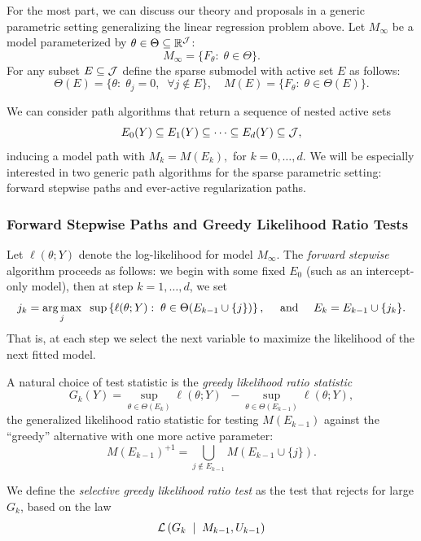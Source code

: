 \documentclass{article}
\begin{document}
For the most part, we can discuss our theory and proposals in a generic parametric setting generalizing the linear regression problem above. Let $M_\infty$ be a model parameterized by $\theta\in \Theta \subseteq \mathbb{R}^{\mathcal{J}}$:
\[
M_\infty = \{F_\theta:\; \theta \in \Theta\}.
\]
For any subset $E\subseteq \mathcal{J}$ define the sparse submodel with active set $E$ as follows:
\[
\Theta(E) = \{\theta:\; \theta_j = 0, \;\;\forall j \notin E\}, 
\quad M(E) = \{F_\theta:\; \theta\in \Theta(E)\}.
\]

We can consider path algorithms that return a sequence of nested active sets
\[
E_0(Y) \subseteq E_1(Y) \subseteq \cdots \subseteq E_d(Y) \subseteq \mathcal{J},
\]
inducing a model path with $M_k = M(E_k),$ for $k=0,\ldots,d$. We will be especially interested in two generic path algorithms for the sparse parametric setting: forward stepwise paths and ever-active regularization paths.

\subsubsection{Forward Stepwise Paths and Greedy Likelihood Ratio Tests}
Let $\ell(\theta; Y)$ denote the log-likelihood for model
$M_\infty$. The {\em forward stepwise} algorithm proceeds as follows: we begin with some fixed $E_0$ (such as an intercept-only model), then at step $k=1,\ldots,d$, we set
\begin{equation}
j_k = \operatorname*{arg\,max}_j \;\;\sup \left\{\ell(\theta; Y):\; \theta\in\Theta(E_{k-1} \cup \{j\})\right\}, \quad \text{ and } \quad
E_k = E_{k-1} \cup \{j_k\}.
\end{equation}
That is, at each step we select the next variable to maximize the likelihood of the next fitted model.

A natural choice of test statistic is the {\em greedy likelihood ratio statistic}
\begin{equation}\label{eq:greedyLRT}
G_k(Y) = \sup_{\theta\in \Theta(E_k)} {\ell(\theta; Y)} \;\;- \sup_{\theta\in \Theta(E_{k-1})} {\ell(\theta; Y)},
\end{equation}
the generalized likelihood ratio statistic for testing $M(E_{k-1})$ against the ``greedy'' alternative with one more active parameter:
\begin{equation}\label{eq:greedyAlternative}
M(E_{k-1})^{+1} = \bigcup_{j \notin E_{k-1}} M(E_{k-1} \cup \{j\}).
\end{equation}

We define the {\em selective greedy likelihood ratio test} as the test that rejects for large $G_k$, based on the law
\begin{equation}
\mathcal{L}\left(G_k \;\mid\; M_{k-1}, U_{k-1}\right)
\end{equation}
\end{document}
